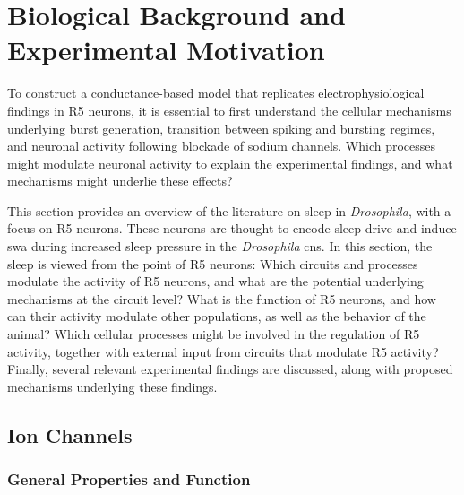 \documentclass[../main.tex]{subfiles}
\begin{document}

\section{Biological Background and Experimental Motivation} \label{sec:sleep_and_r5_network}


To construct a conductance-based model that replicates electrophysiological findings in R5 neurons, it is essential to first understand the cellular mechanisms underlying burst generation, transition between spiking and bursting regimes, and neuronal activity following blockade of sodium channels.
Which processes might modulate neuronal activity to explain the experimental findings, and what mechanisms might underlie these effects?

This section provides an overview of the literature on sleep in \textit{Drosophila}, with a focus on R5 neurons. These neurons are thought to encode sleep drive and induce \gls{swa} during increased sleep pressure in the \textit{Drosophila}
\gls{cns}. In this section, the sleep is viewed from the point of R5 neurons: Which circuits and processes modulate the activity of R5 neurons, and what are the potential underlying mechanisms at the circuit level? What is the function of R5 neurons, and how can their activity modulate other populations, as well as the behavior of the animal? Which cellular processes might be involved in the regulation of R5 activity, together with external input from circuits that modulate R5 activity? Finally, several relevant experimental findings are discussed, along with proposed mechanisms underlying these findings.


\subsection{Ion Channels}
\subsubsection{General Properties and Function}\label{subsubsec:ion_channel_properties_and_function}
\end{document}
